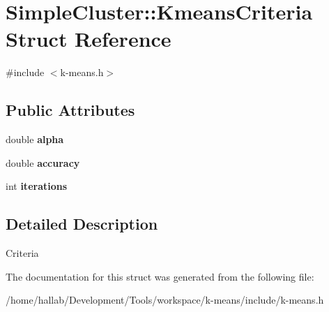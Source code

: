 \hypertarget{structSimpleCluster_1_1KmeansCriteria}{\section{Simple\-Cluster\-:\-:Kmeans\-Criteria Struct Reference}
\label{structSimpleCluster_1_1KmeansCriteria}
}


{\ttfamily \#include $<$k-\/means.\-h$>$}

\subsection*{Public Attributes}
\begin{DoxyCompactItemize}
\item 
\hypertarget{structSimpleCluster_1_1KmeansCriteria_a90eb14d83eaaa78c6aa590cc03db151a}{double {\bfseries alpha}}\label{structSimpleCluster_1_1KmeansCriteria_a90eb14d83eaaa78c6aa590cc03db151a}

\item 
\hypertarget{structSimpleCluster_1_1KmeansCriteria_a417746caabd9c8aa94eae201ebe706ff}{double {\bfseries accuracy}}\label{structSimpleCluster_1_1KmeansCriteria_a417746caabd9c8aa94eae201ebe706ff}

\item 
\hypertarget{structSimpleCluster_1_1KmeansCriteria_a315f994501adf69d674ff6ab57291f91}{int {\bfseries iterations}}\label{structSimpleCluster_1_1KmeansCriteria_a315f994501adf69d674ff6ab57291f91}

\end{DoxyCompactItemize}


\subsection{Detailed Description}
Criteria 

The documentation for this struct was generated from the following file\-:\begin{DoxyCompactItemize}
\item 
/home/hallab/\-Development/\-Tools/workspace/k-\/means/include/k-\/means.\-h\end{DoxyCompactItemize}
